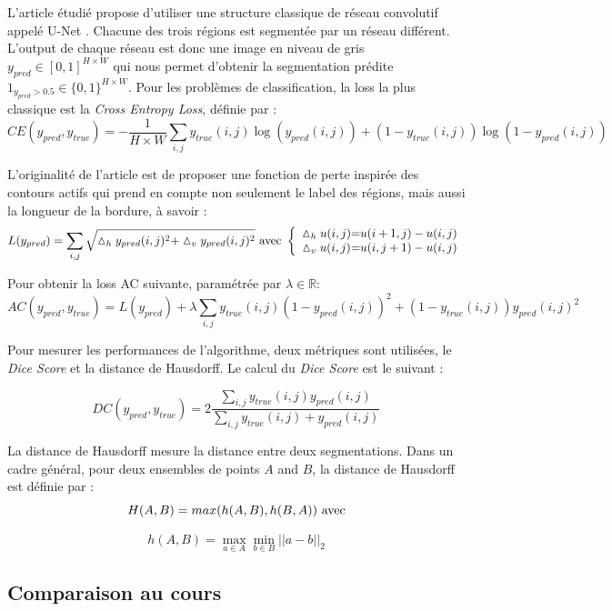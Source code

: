 \documentclass{article}
\begin{document}
L'article étudié propose d'utiliser une structure classique de réseau convolutif appelé U-Net \cite{unet}. Chacune des trois régions est segmentée par un réseau différent. L'output de chaque réseau est donc une image en niveau de gris  $y_{pred}  \in [0,1]^{H \times W}$ qui nous permet d'obtenir la segmentation prédite $1_{y_{pred}>0.5} \in \{0,1\}^{H \times W}$. Pour les problèmes de classification, la loss la plus classique est la \textit{Cross Entropy Loss}, définie par : 
\[ CE(y_{pred},y_{true}) = - \frac{1}{H \times W} \sum_{i,j} y_{true}(i,j) \log{(y_{pred}(i,j))} + (1-y_{true}(i,j))  \log{(1-y_{pred}(i,j))} \]

L'originalité de l'article est de proposer une fonction de perte inspirée des contours actifs qui prend en compte non seulement le label des régions, mais aussi la longueur de la bordure, à savoir :
\[ L(y_{pred}) = \sum_{i,j} \sqrt{ \vartriangle_h y_{pred}(i,j)^2 + \vartriangle_v y_{pred}(i,j)^2  } \ \textnormal{avec} \ \left \{
\begin{array}{c @{=} c}
    \vartriangle_h u(i,j) & u(i+1,j) - u(i,j)   \\
    \vartriangle_v u(i,j) & u(i,j+1) - u(i,j)  
\end{array}
\right. \]

Pour obtenir la loss AC suivante, paramétrée par $\lambda \in \mathbb{R}$:
 \[ AC(y_{pred},y_{true})  =  L(y_{pred}) + \lambda \sum_{i,j} y_{true}(i,j) (1-y_{pred}(i,j))^2 +  (1-y_{true}(i,j)) y_{pred}(i,j)^2 \]
 
Pour mesurer les performances de l'algorithme, deux métriques sont utilisées, le \textit{Dice Score} et la distance de Hausdorff. Le calcul du \textit{Dice Score} est le suivant :

 \[ DC(y_{pred},y_{true})  =  2 \frac{\sum_{i,j} y_{true}(i,j) y_{pred}(i,j)}{\sum_{i,j} y_{true}(i,j) + y_{pred}(i,j)}  \]
 
La distance de Hausdorff mesure la distance entre deux segmentations. Dans un cadre général, pour deux ensembles de points $A$ and $B$, la distance de Hausdorff est définie par :
\[ H(A,B) = max(h(A,B), h(B,A)) \ \textnormal{avec}  \]

\[ h(A,B) = \max_{a \in A} \min_{b \in B} ||a-b||_2\]

\subsection{Comparaison au cours}
\end{document}
